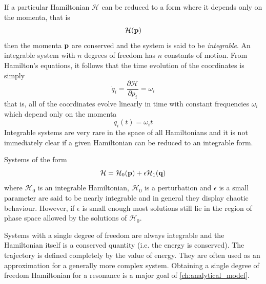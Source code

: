 \documentclass[twoside,openright,titlepage,numbers=noenddot,headinclude,%
                footinclude=true,cleardoublepage=empty,abstractoff, 
                BCOR=5mm,paper=a4,fontsize=11pt,%
                american,%
                ]{scrreprt}%
\begin{document}
If a particular Hamiltonian $\mathcal{H}$ can be reduced to a form
where it depends only on the momenta, that is
\begin{equation}
    \mathcal{H}(\boldsymbol{\mathbf{p}})
\end{equation}
then the momenta $\boldsymbol{\mathbf{p}}$ are conserved and the system is said to be
\emph{integrable}. An integrable system with $n$ degrees of freedom
has $n$ constants of motion. From Hamilton's equations, it follows that the time
evolution of the coordinates is simply
\begin{equation}
    \dot{q}_i= \frac{\partial \mathcal{H}}{\partial p_i} =\omega_i
\end{equation}
that is, all of the coordinates evolve linearly in time with constant
frequencies $\omega_i$ which depend only on the momenta
\begin{equation}
q_i(t)=\omega_i t
\end{equation}
Integrable systems are very rare  in the space of all Hamiltonians and 
it is not immediately clear
if a given Hamiltonian can be reduced to an integrable form.

Systems of the form
\begin{equation}
    \mathcal{H}=\mathcal{H}_0(\boldsymbol{\mathbf{p}})+\epsilon \mathcal{H}_1(\boldsymbol{\mathbf{q}})
\end{equation}
where $\mathcal{H}_0$ is an integrable Hamiltonian, $\mathcal{H}_0$ is 
a perturbation and $\epsilon$ is a small parameter are said to be nearly 
integrable
and in general they display chaotic behaviour. However, if $\epsilon$ is 
small enough most solutions still lie in the region of phase space
allowed by the solutions of $\mathcal{H}_0$.

Systems with a single degree of freedom are always integrable and
the Hamiltonian itself is a conserved quantity (i.e. the energy
is conserved). The trajectory is defined completely by the value
of energy. They are often used as an approximation for a generally
more complex system. Obtaining a single degree of freedom
Hamiltonian for a resonance is a major goal of
\cref{ch:analytical_model}.
\end{document}
